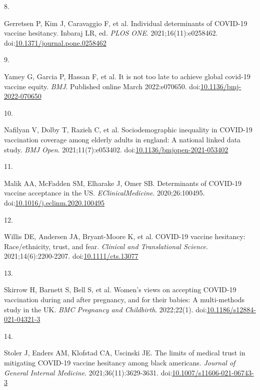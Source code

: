 \documentclass[
  letterpaper,
  DIV=11,
  numbers=noendperiod]{scrartcl}
\newlength{\cslhangindent}
\newlength{\csllabelwidth}
\newlength{\cslentryspacingunit} %
\newenvironment{CSLReferences}[2] %
 {%
  \setlength{\parindent}{0pt}
  \ifodd #1
  \let\oldpar\par
  \def\par{\hangindent=\cslhangindent\oldpar}
  \fi
  \setlength{\parskip}{#2\cslentryspacingunit}
 }%
 {}
\newcommand{\CSLLeftMargin}[1]{\parbox[t]{\csllabelwidth}{#1}}
\newcommand{\CSLRightInline}[1]{\parbox[t]{\linewidth - \csllabelwidth}{#1}\break}
\begin{document}
\begin{CSLReferences}{0}{0}
\leavevmode{}%
\CSLLeftMargin{8. }%
\CSLRightInline{Gerretsen P, Kim J, Caravaggio F, et al. Individual
determinants of {COVID}-19 vaccine hesitancy. Inbaraj LR, ed.
\emph{{PLOS} {ONE}}. 2021;16(11):e0258462.
doi:\href{https://doi.org/10.1371/journal.pone.0258462}{10.1371/journal.pone.0258462}}

\leavevmode{}%
\CSLLeftMargin{9. }%
\CSLRightInline{Yamey G, Garcia P, Hassan F, et al. It is not too late
to achieve global covid-19 vaccine equity. \emph{{BMJ}}. Published
online March 2022:e070650.
doi:\href{https://doi.org/10.1136/bmj-2022-070650}{10.1136/bmj-2022-070650}}

\leavevmode{}%
\CSLLeftMargin{10. }%
\CSLRightInline{Nafilyan V, Dolby T, Razieh C, et al. Sociodemographic
inequality in {COVID}-19 vaccination coverage among elderly adults in
england: A national linked data study. \emph{{BMJ} Open}.
2021;11(7):e053402.
doi:\href{https://doi.org/10.1136/bmjopen-2021-053402}{10.1136/bmjopen-2021-053402}}

\leavevmode{}%
\CSLLeftMargin{11. }%
\CSLRightInline{Malik AA, McFadden SM, Elharake J, Omer SB. Determinants
of {COVID}-19 vaccine acceptance in the {US}.
\emph{{EClinicalMedicine}}. 2020;26:100495.
doi:\href{https://doi.org/10.1016/j.eclinm.2020.100495}{10.1016/j.eclinm.2020.100495}}

\leavevmode{}%
\CSLLeftMargin{12. }%
\CSLRightInline{Willis DE, Andersen JA, Bryant-Moore K, et al.
{COVID}-19 vaccine hesitancy: Race/ethnicity, trust, and fear.
\emph{Clinical and Translational Science}. 2021;14(6):2200-2207.
doi:\href{https://doi.org/10.1111/cts.13077}{10.1111/cts.13077}}

\leavevmode{}%
\CSLLeftMargin{13. }%
\CSLRightInline{Skirrow H, Barnett S, Bell S, et al. Women's views on
accepting {COVID}-19 vaccination during and after pregnancy, and for
their babies: A multi-methods study in the {UK}. \emph{{BMC} Pregnancy
and Childbirth}. 2022;22(1).
doi:\href{https://doi.org/10.1186/s12884-021-04321-3}{10.1186/s12884-021-04321-3}}

\leavevmode{}%
\CSLLeftMargin{14. }%
\CSLRightInline{Stoler J, Enders AM, Klofstad CA, Uscinski JE. The
limits of medical trust in mitigating {COVID}-19 vaccine hesitancy among
black americans. \emph{Journal of General Internal Medicine}.
2021;36(11):3629-3631.
doi:\href{https://doi.org/10.1007/s11606-021-06743-3}{10.1007/s11606-021-06743-3}}


\end{CSLReferences}
\end{document}

